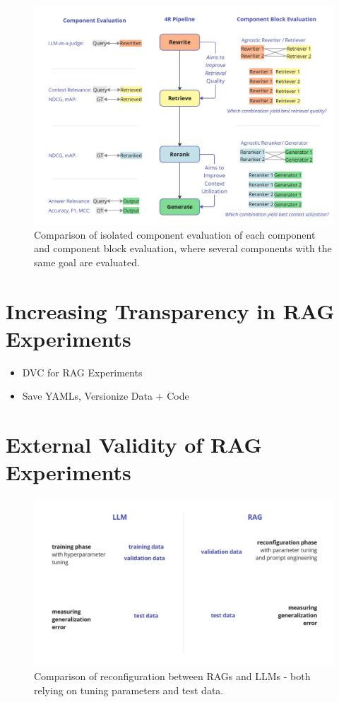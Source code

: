 \begin{figure}
  \centering
  \includegraphics[width=\textwidth]{images/ComponentBlockEvaluation.pdf}
  \caption{Comparison of isolated component evaluation of each component and component block evaluation, where several components with the same goal are evaluated.}
  \label{fig:componentblockeval}
\end{figure}

\section{Increasing Transparency in RAG Experiments}

\begin{itemize}
    \item DVC for RAG Experiments
    \item Save YAMLs, Versionize Data + Code
\end{itemize}

\section{External Validity of RAG Experiments}

\begin{figure}
    \centering
    \includegraphics[width=\textwidth]{images/RAGvsLLM-tuning.pdf}
    \caption{Comparison of reconfiguration between RAGs and LLMs - both relying on tuning parameters and test data.}
    \label{fig:tuning}
\end{figure}


